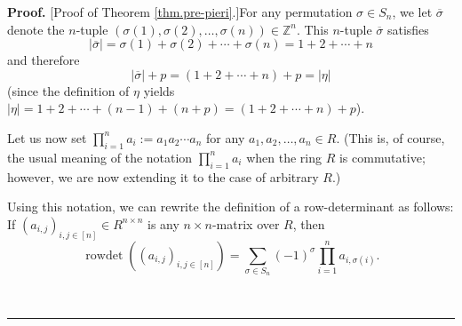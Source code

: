 \documentclass
[numbers=enddot,12pt,final,onecolumn,notitlepage,english]{scrartcl}%
\theoremstyle{definition}
\newenvironment{proof}[1][Proof]{\noindent\textbf{#1.} }{\ \rule{0.5em}{0.5em}}
\let\sumnonlimits\sum
\let\prodnonlimits\prod
\renewcommand{\sum}{\sumnonlimits\limits}
\renewcommand{\prod}{\prodnonlimits\limits}
\newenvironment{vershort}{}{}
\begin{document}
\begin{vershort}
\begin{proof}
[Proof of Theorem \ref{thm.pre-pieri}.]For any permutation $\sigma\in S_{n}$,
we let $\overline{\sigma}$ denote the $n$-tuple $\left(  \sigma\left(
1\right)  ,\sigma\left(  2\right)  ,\ldots,\sigma\left(  n\right)  \right)
\in\mathbb{Z}^{n}$. This $n$-tuple $\overline{\sigma}$ satisfies
\[
\left\vert \overline{\sigma}\right\vert =\sigma\left(  1\right)
+\sigma\left(  2\right)  +\cdots+\sigma\left(  n\right)  =1+2+\cdots+n
\]
and therefore
\begin{equation}
\left\vert \overline{\sigma}\right\vert +p=\left(  1+2+\cdots+n\right)
+p=\left\vert \eta\right\vert \label{pf.thm.pre-pieri.short.modsigbar1}%
\end{equation}
(since the definition of $\eta$ yields \newline$\left\vert \eta\right\vert
=1+2+\cdots+\left(  n-1\right)  +\left(  n+p\right)  =\left(  1+2+\cdots
+n\right)  +p$).

Let us now set $\prod_{i=1}^{n}a_{i}:=a_{1}a_{2}\cdots a_{n}$ for any
$a_{1},a_{2},\ldots,a_{n}\in R$. (This is, of course, the usual meaning of the
notation $\prod_{i=1}^{n}a_{i}$ when the ring $R$ is commutative; however, we
are now extending it to the case of arbitrary $R$.)

Using this notation, we can rewrite the definition of a row-determinant as
follows: If $\left(  a_{i,j}\right)  _{i,j\in\left[  n\right]  }\in R^{n\times
n}$ is any $n\times n$-matrix over $R$, then%
\begin{equation}
\operatorname*{rowdet}\left(  \left(  a_{i,j}\right)  _{i,j\in\left[
n\right]  }\right)  =\sum_{\sigma\in S_{n}}\left(  -1\right)  ^{\sigma}%
\prod_{i=1}^{n}a_{i,\sigma\left(  i\right)  }.
\label{pf.thm.pre-pieri.short.rowdetA=}%
\end{equation}



\end{proof}
\end{vershort}
\end{document}
